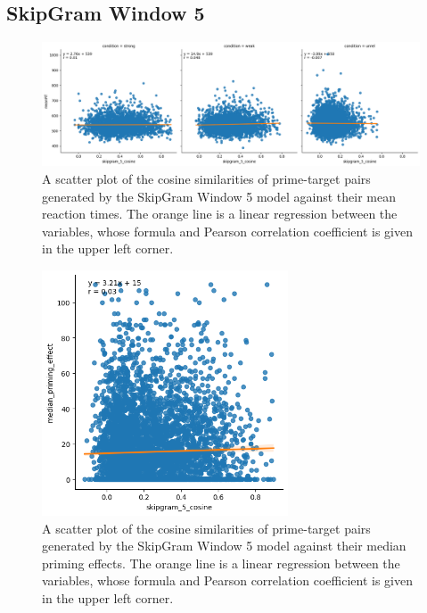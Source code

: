 \documentclass{IEEEtran}
\begin{document}
\subsection*{SkipGram Window 5}
\begin{figure}[h]
    \centering
    \includegraphics[width=\textwidth]{images/skipgram_5_cosine_against_meanrt.png}
    \caption{A scatter plot of the cosine similarities of prime-target pairs generated by the SkipGram Window 5 model against their mean reaction times. The orange line is a linear regression between the variables, whose formula and Pearson correlation coefficient is given in the upper left corner.}
\end{figure}
\begin{figure}[h]
    \centering
    \includegraphics[width=0.65\textwidth]{images/skipgram_5_cosine_against_priming_effect.png}
    \caption{A scatter plot of the cosine similarities of prime-target pairs generated by the SkipGram Window 5 model against their median priming effects. The orange line is a linear regression between the variables, whose formula and Pearson correlation coefficient is given in the upper left corner.}
\end{figure}

\newpage
\end{document}
